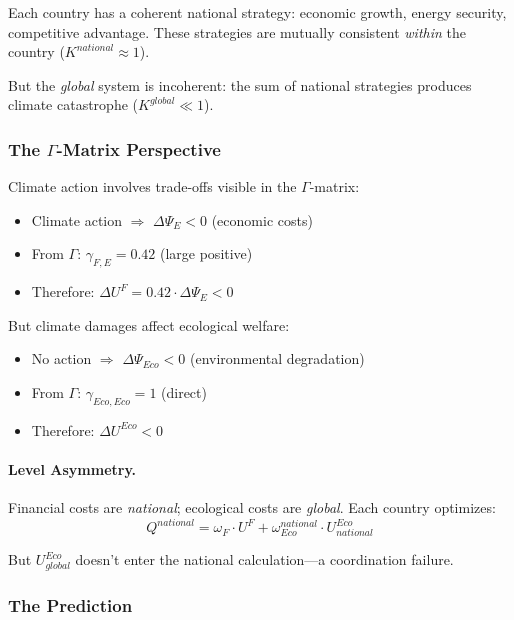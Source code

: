 Each country has a coherent national strategy: economic growth, energy security, 
competitive advantage. These strategies are mutually consistent \emph{within} 
the country ($K^{national} \approx 1$).

But the \emph{global} system is incoherent: the sum of national strategies 
produces climate catastrophe ($K^{global} \ll 1$).

\subsubsection{The $\Gamma$-Matrix Perspective}

Climate action involves trade-offs visible in the $\Gamma$-matrix:

\begin{itemize}
  \item Climate action $\Rightarrow$ $\Delta \Psi_E < 0$ (economic costs)
  \item From $\Gamma$: $\gamma_{F,E} = 0.42$ (large positive)
  \item Therefore: $\Delta U^F = 0.42 \cdot \Delta \Psi_E < 0$
\end{itemize}

But climate damages affect ecological welfare:
\begin{itemize}
  \item No action $\Rightarrow$ $\Delta \Psi_{Eco} < 0$ (environmental degradation)
  \item From $\Gamma$: $\gamma_{Eco,Eco} = 1$ (direct)
  \item Therefore: $\Delta U^{Eco} < 0$
\end{itemize}

\paragraph{Level Asymmetry.}
Financial costs are \emph{national}; ecological costs are \emph{global}.
Each country optimizes:
\begin{equation}
Q^{national} = \omega_F \cdot U^F + \omega_{Eco}^{national} \cdot U^{Eco}_{national}
\end{equation}

But $U^{Eco}_{global}$ doesn't enter the national calculation---a coordination failure.

\subsubsection{The Prediction}

